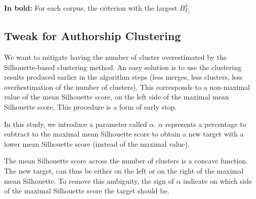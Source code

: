 \begin{table}[!t]
  \caption{Silhouette-based clustering evaluation (Maximal Silhouette, $\alpha = 0$), mean $B^3_{F_1}$/$r_{diff}$}
  \label{tab:silhouette-based_clustering}

  \vspace{0.2cm}

  \textbf{In bold:} For each corpus, the criterion with the largest $B^3_{F_1}$
\end{table}

\subsection{Tweak for Authorship Clustering}

We want to mitigate having the number of cluster overestimated by the Silhouette-based clustering method.
An easy solution is to use the clustering results produced earlier in the algorithm steps (less merges, less clusters, less overhestimation of the number of clusters).
This corresponds to a non-maximal value of the mean Silhouette score, on the left side of the maximal mean Silhouette score.
This procedure is a form of early stop.

In this study, we introduce a parameter called $\alpha$.
$\alpha$ represents a percentage to subtract to the maximal mean Silhouette score to obtain a new target with a lower mean Silhouette score (instead of the maximal value).

The mean Silhouette score across the number of clusters is a concave function.
The new target, can thus be either on the left or on the right of the maximal mean Silhouette.
To remove this ambiguity, the sign of $\alpha$ indicate on which side of the maximal Silhouette score the target should be.

